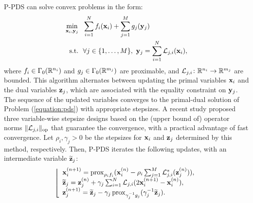 P-PDS \cite{pock2011diagonal} can solve convex problems in the form: 
\begin{equation}
    \label{equation:pds}
    \begin{split}
        \minimum{\x_i, \y_j} &\summation{i = 1}{N} f_i \parentheses{\x_i} + \summation{j = 1}{M} g_j \parentheses{\y_j} \\
        \st                   &\forall j \in \set{1, \dots, M}, \ \y_j = \summation{i = 1}{N} \Lcal_{j, i} \parentheses{\x_i},
    \end{split}
\end{equation}
where $f_i \in \Gamma_0 (\mathbb{R}^{n_i})$ and $g_j \in \Gamma_0 (\mathbb{R}^{m_j})$ are proximable, and ${\mathcal{L}_{j, i}} \colon {\mathbb{R}^{n_i}} \to {\mathbb{R}^{m_j}}$ are bounded.
This algorithm alternates between updating the primal variables $\mathbf{x}_i$ and the dual variables $\mathbf{z}_j$, which are associated with the equality constraint on $\mathbf{y}_j$.
The sequence of the updated variables converges to the primal-dual solution of Problem (\ref{equation:pds}) with appropriate stepsizes.
A recent study \cite{naganuma2023variable} proposed three variable-wise stepsize designs based on the (upper bound of) operator norms $\lVert \mathcal{L}_{j, i} \rVert_\text{op}$ that guarantee the convergence, with a practical advantage of fast convergence.
Let $\rho_i, \gamma_j > 0$ be the stepsizes for $\mathbf{x}_i$ and $\mathbf{z}_j$ determined by this method, respectively.
Then, P-PDS iterates the following updates, with an intermediate variable $\widetilde{\mathbf{z}}_j$:
\begin{equation}
	\label{algo:P-PDS}
	\left\lfloor 
		\begin{array}{l}
        \mathbf{x}_i^{(n + 1)} = \operatorname{prox}_{\rho_i f_i} ({\mathbf{x}_i^{(n)} - \rho_i \sum_{j = 1}^{M} \mathcal{L}_{j, i}^{\ast} (\mathbf{z}_j^{(n)})}), \\
        \widetilde{\mathbf{z}}_j = \mathbf{z}_j^{(n)} + \gamma_j \sum_{i = 1}^{N} \mathcal{L}_{j, i} (2 \mathbf{x}_i^{(n + 1)} - \mathbf{x}_i^{(n)}), \\
        \mathbf{z}_j^{(n + 1)} = \widetilde{\mathbf{z}}_j - \gamma_j \operatorname{prox}_{\gamma_j^{-1} g_j} ({\gamma_j^{-1} \widetilde{\mathbf{z}}_j}). \\
        \end{array}
	 \right.
\end{equation}